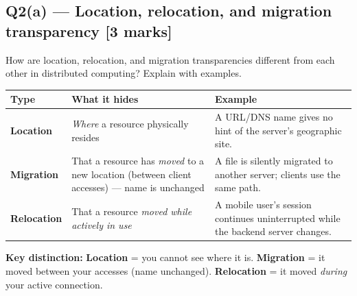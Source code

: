 \documentclass[12pt, a4paper]{article}
\newenvironment{qbox}{\begin{mdframed}[style=qframe]}{\end{mdframed}}
\newenvironment{solbox}{\begin{mdframed}[style=solframe]}{\end{mdframed}}
\newcommand{\qmarks}[1]{\hfill\textbf{\color{orange!70!black}[#1 marks]}}
\begin{document}
\subsection{Q2(a) — Location, relocation, and migration transparency \texorpdfstring{\qmarks{3}}{}}
\begin{qbox}How are location, relocation, and migration transparencies different from each other in distributed computing? Explain with examples.\end{qbox}
\begin{solbox}
\begin{center}\renewcommand{\arraystretch}{1.35}
\begin{tabularx}{\linewidth}{l X X}
\toprule
\textbf{Type} & \textbf{What it hides} & \textbf{Example} \\
\midrule
\textbf{Location} & \textit{Where} a resource physically resides & A URL/DNS name gives no hint of the server's geographic site. \\[4pt]
\textbf{Migration} & That a resource has \textit{moved} to a new location (between client accesses) — name is unchanged & A file is silently migrated to another server; clients use the same path. \\[4pt]
\textbf{Relocation} & That a resource \textit{moved while actively in use} & A mobile user's session continues uninterrupted while the backend server changes. \\
\bottomrule
\end{tabularx}\end{center}

\textbf{Key distinction:} \textbf{Location} = you cannot see where it is. \textbf{Migration} = it moved between your accesses (name unchanged). \textbf{Relocation} = it moved \emph{during} your active connection.
\end{solbox}

\end{document}
